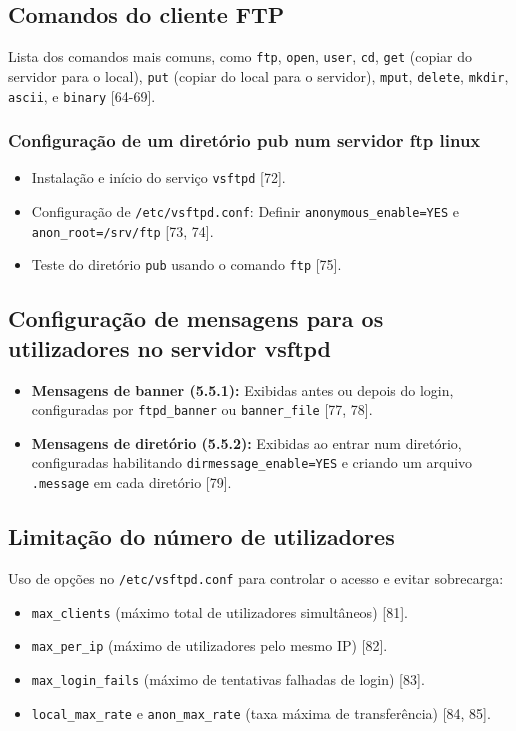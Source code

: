 \documentclass[12pt, a4paper]{article}
\begin{document}
	\subsection{Comandos do cliente FTP} %
	Lista dos comandos mais comuns, como \texttt{ftp}, \texttt{open}, \texttt{user}, \texttt{cd}, \texttt{get} (copiar do servidor para o local), \texttt{put} (copiar do local para o servidor), \texttt{mput}, \texttt{delete}, \texttt{mkdir}, \texttt{ascii}, e \texttt{binary} [64-69].
	
	\subsubsection{Configuração de um diretório pub num servidor ftp linux} %
	\begin{itemize}
		\item Instalação e início do serviço \texttt{vsftpd} [72].
		\item Configuração de \texttt{/etc/vsftpd.conf}: Definir \texttt{anonymous\_enable=YES} e \texttt{anon\_root=/srv/ftp} [73, 74].
		\item Teste do diretório \texttt{pub} usando o comando \texttt{ftp} [75].
	\end{itemize}
	
	\subsection{Configuração de mensagens para os utilizadores no servidor vsftpd} %
	\begin{itemize}
		\item \textbf{Mensagens de banner (5.5.1):} Exibidas antes ou depois do login, configuradas por \texttt{ftpd\_banner} ou \texttt{banner\_file} [77, 78].
		\item \textbf{Mensagens de diretório (5.5.2):} Exibidas ao entrar num diretório, configuradas habilitando \texttt{dirmessage\_enable=YES} e criando um arquivo \texttt{.message} em cada diretório [79].
	\end{itemize}
	
	\subsection{Limitação do número de utilizadores} %
	Uso de opções no \texttt{/etc/vsftpd.conf} para controlar o acesso e evitar sobrecarga:
	\begin{itemize}
		\item \texttt{max\_clients} (máximo total de utilizadores simultâneos) [81].
		\item \texttt{max\_per\_ip} (máximo de utilizadores pelo mesmo IP) [82].
		\item \texttt{max\_login\_fails} (máximo de tentativas falhadas de login) [83].
		\item \texttt{local\_max\_rate} e \texttt{anon\_max\_rate} (taxa máxima de transferência) [84, 85].
	\end{itemize}
	
\end{document}
